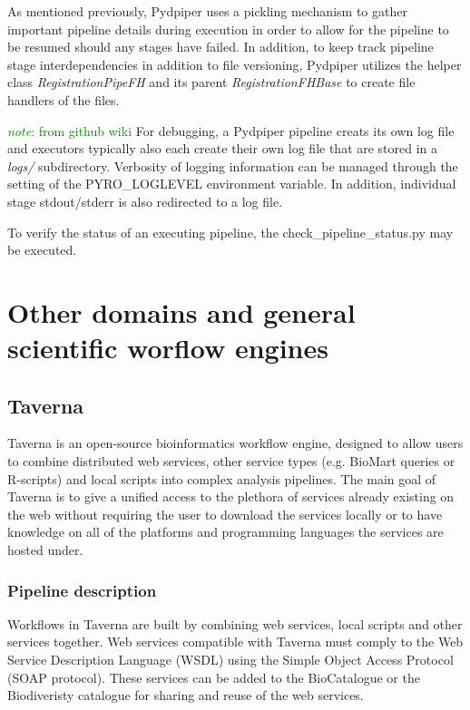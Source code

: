 \documentclass{report}
\newcommand{\note}[1]{\textcolor{green}{\textit{note}: #1}}
\begin{document}
        As mentioned previously, Pydpiper uses a pickling mechanism to gather important pipeline details
        during execution in order to allow for the pipeline to be resumed should any stages have failed.
        In addition, to keep track pipeline stage interdependencies in addition to file versioning, Pydpiper
        utilizes the helper class \textit{RegistrationPipeFH} and its parent \textit{RegistrationFHBase} to create
        file handlers of the files.

        \note{from github wiki}
        For debugging, a Pydpiper pipeline creats its own log file and executors typically also each create 
        their own log file that are stored in a \textit{logs/}
        subdirectory. Verbosity of logging information can be managed through the setting of the PYRO\_LOGLEVEL
        environment variable. In addition, individual stage stdout/stderr is also redirected to a log file.

        To verify the status of an executing pipeline, the check\_pipeline\_status.py may be executed.
 

\chapter{Other domains and general scientific worflow engines}
    \section{Taverna}
    Taverna is an open-source bioinformatics workflow engine, designed to allow users to combine distributed web services, other service
    types (e.g. BioMart queries or R-scripts) and local scripts into complex analysis pipelines. The main goal of
    Taverna is to give a unified access to the plethora of services already existing on the web without requiring
    the user to download the services locally or to have knowledge on all of the platforms and programming languages
    the services are hosted under.

    

        \subsection{Pipeline description}
        Workflows in Taverna are built by combining web services, local scripts and other services together. Web services compatible with
        Taverna must comply to the Web Service Description Language (WSDL) using the Simple Object Access Protocol (SOAP protocol). 
        These services can be added to the BioCatalogue or the Biodiveristy catalogue for sharing and reuse of the web services. 
\end{document}
